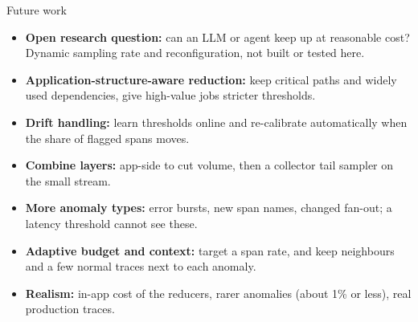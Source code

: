 \documentclass[aspectratio=169,11pt]{beamer}
\newcommand{\m}[1]{\texttt{\detokenize{#1}}}
\begin{document}
\begin{frame}{Future work}
  \small
  \begin{itemize}
    \item \textbf{Open research question:} can an LLM or agent keep up at reasonable cost? Dynamic sampling rate and reconfiguration, not built or tested here.
    \item \textbf{Application-structure-aware reduction:} keep critical paths and widely used dependencies, give high-value jobs stricter thresholds.
    \item \textbf{Drift handling:} learn thresholds online and re-calibrate automatically when the share of flagged spans moves.
    \item \textbf{Combine layers:} app-side \m{span_filter_path} to cut volume, then a collector tail sampler on the small stream.
    \item \textbf{More anomaly types:} error bursts, new span names, changed fan-out; a latency threshold cannot see these.
    \item \textbf{Adaptive budget and context:} target a span rate, and keep neighbours and a few normal traces next to each anomaly.
    \item \textbf{Realism:} in-app cost of the reducers, rarer anomalies (about 1\% or less), real production traces.
  \end{itemize}
\end{frame}
\end{document}
